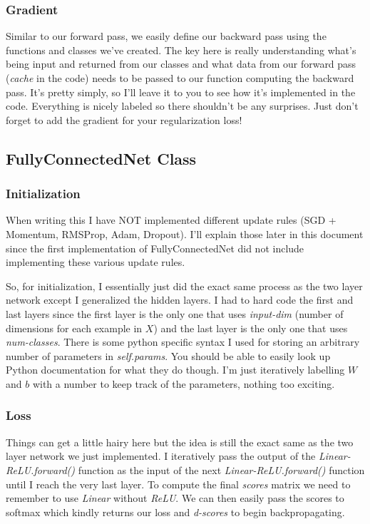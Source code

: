 \documentclass[12pt]{article}
\begin{document}
\subsubsection{Gradient}
Similar to our forward pass, we easily define our backward pass using the functions and classes 
we've created. The key here is really understanding what's being input and returned from our 
classes and what data from our forward pass (\emph{cache} in the code) needs to be passed to 
our function computing the backward pass. It's pretty simply, so I'll leave it to you to see how 
it's implemented in the code. Everything is nicely labeled so there shouldn't be any surprises. 
Just don't forget to add the gradient for your regularization loss! 

\subsection{FullyConnectedNet Class}

\subsubsection{Initialization}
When writing this I have NOT implemented different update rules (SGD + Momentum, RMSProp, Adam, Dropout). 
I'll explain those later in this document since the first implementation of FullyConnectedNet did 
not include implementing these various update rules. 

So, for initialization, I essentially just did the exact same process as the two layer network
except I generalized the hidden layers. I had to hard code the first and last layers since the first
layer is the only one that uses \emph{input-dim} (number of dimensions for each example in $X$) and 
the last layer is the only one that uses \emph{num-classes}. There is some python specific syntax
I used for storing an arbitrary number of parameters in \emph{self.params}. You should be able 
to easily look up Python documentation for what they do though. I'm just iteratively labelling 
$W$ and $b$ with a number to keep track of the parameters, nothing too exciting. 

\subsubsection{Loss}
Things can get a little hairy here but the idea is still the exact same as the two layer network
we just implemented. I iteratively pass the output of the \emph{Linear-ReLU.forward()} function
as the input of the next \emph{Linear-ReLU.forward()} function until I reach the very last layer. 
To compute the final \emph{scores} matrix we need to remember to use \emph{Linear} without \emph{ReLU}. 
We can then easily pass the scores to softmax which kindly returns our loss and \emph{d-scores} to 
begin backpropagating. 
\end{document}
